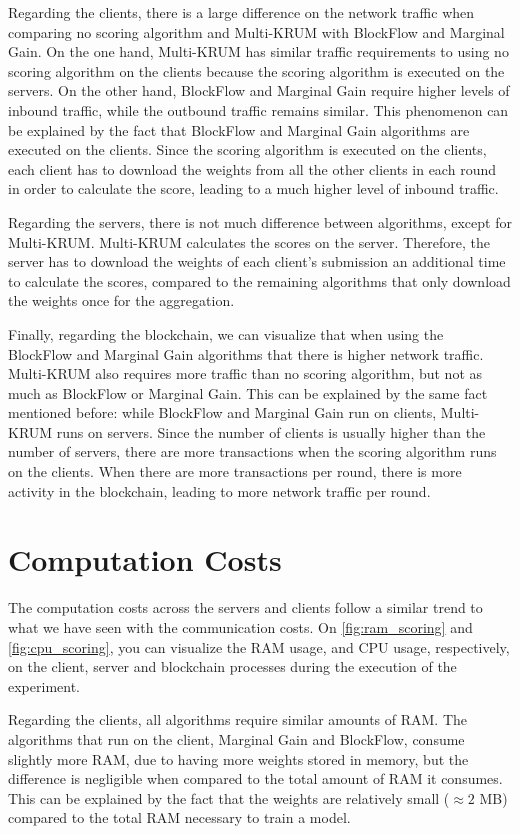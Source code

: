Regarding the clients, there is a large difference on the network traffic when comparing no scoring algorithm and Multi-KRUM with BlockFlow and Marginal Gain. On the one hand, Multi-KRUM has similar traffic requirements to using no scoring algorithm on the clients because the scoring algorithm is executed on the servers. On the other hand, BlockFlow and Marginal Gain require higher levels of inbound traffic, while the outbound traffic remains similar. This phenomenon can be explained by the fact that BlockFlow and Marginal Gain algorithms are executed on the clients. Since the scoring algorithm is executed on the clients, each client has to download the weights from all the other clients in each round in order to calculate the score, leading to a much higher level of inbound traffic.

Regarding the servers, there is not much difference between algorithms, except for Multi-KRUM. Multi-KRUM calculates the scores on the server. Therefore, the server has to download the weights of each client's submission an additional time to calculate the scores, compared to the remaining algorithms that only download the weights once for the aggregation.

Finally, regarding the blockchain, we can visualize that when using the BlockFlow and Marginal Gain algorithms that there is higher network traffic. Multi-KRUM also requires more traffic than no scoring algorithm, but not as much as BlockFlow or Marginal Gain. This can be explained by the same fact mentioned before: while BlockFlow and Marginal Gain run on clients, Multi-KRUM runs on servers. Since the number of clients is usually higher than the number of servers, there are more transactions when the scoring algorithm runs on the clients. When there are more transactions per round, there is more activity in the blockchain, leading to more network traffic per round.

\section{Computation Costs}

The computation costs across the servers and clients follow a similar trend to what we have seen with the communication costs. On \autoref{fig:ram_scoring} and \autoref{fig:cpu_scoring}, you can visualize the RAM usage, and CPU usage, respectively, on the client, server and blockchain processes during the execution of the experiment.

Regarding the clients, all algorithms require similar amounts of RAM. The algorithms that run on the client, Marginal Gain and BlockFlow, consume slightly more RAM, due to having more weights stored in memory, but the difference is negligible when compared to the total amount of RAM it consumes. This can be explained by the fact that the weights are relatively small ($\approx 2$ MB) compared to the total RAM necessary to train a model.

